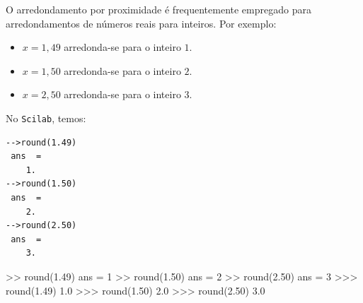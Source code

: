 \begin{obs}
  O arredondamento por proximidade é frequentemente empregado para arredondamentos de números reais para inteiros. Por exemplo:
  \begin{itemize}
  \item $x=1,49$ arredonda-se para o inteiro $1$.
  \item $x=1,50$ arredonda-se para o inteiro $2$.
  \item $x=2,50$ arredonda-se para o inteiro $3$.
  \end{itemize}
\ifisscilab
No \verb+Scilab+, temos:
\begin{verbatim}
-->round(1.49)
 ans  =
    1.  
-->round(1.50)
 ans  =
    2.  
-->round(2.50)
 ans  =
    3.  
\end{verbatim}
\fi
\ifisoctave
>> round(1.49)
ans =  1
>> round(1.50)
ans =  2
>> round(2.50)
ans =  3
\fi
\ifispython
>>> round(1.49)
1.0
>>> round(1.50)
2.0
>>> round(2.50)
3.0
\fi
\end{obs}


